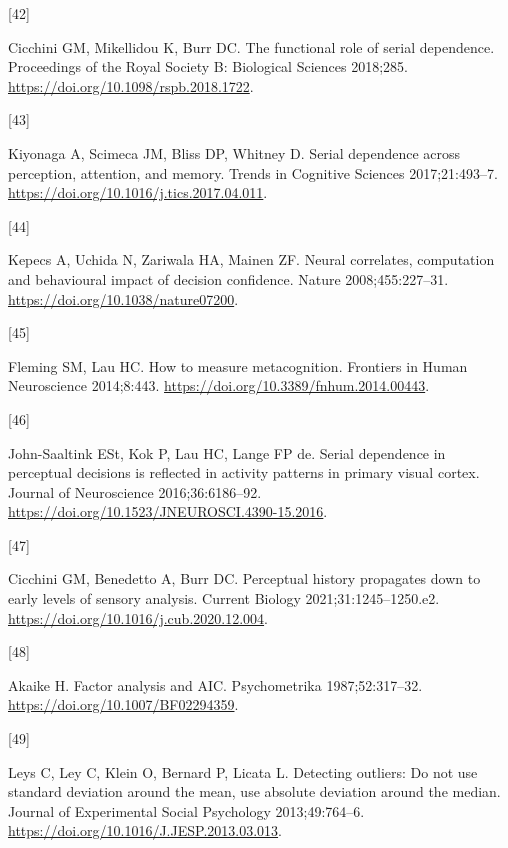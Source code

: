 \documentclass[
]{article}
\newlength{\cslhangindent}
\newlength{\csllabelwidth}
\newlength{\cslentryspacingunit} %
\newenvironment{CSLReferences}[2] %
 {%
  \setlength{\parindent}{0pt}
  \ifodd #1
  \let\oldpar\par
  \def\par{\hangindent=\cslhangindent\oldpar}
  \fi
  \setlength{\parskip}{#2\cslentryspacingunit}
 }%
 {}
\newcommand{\CSLLeftMargin}[1]{\parbox[t]{\csllabelwidth}{#1}}
\newcommand{\CSLRightInline}[1]{\parbox[t]{\linewidth - \csllabelwidth}{#1}\break}
\begin{document}
\begin{CSLReferences}{0}{0}
\leavevmode{}%
\CSLLeftMargin{{[}42{]} }%
\CSLRightInline{Cicchini GM, Mikellidou K, Burr DC. The functional role
of serial dependence. Proceedings of the Royal Society B: Biological
Sciences 2018;285. \url{https://doi.org/10.1098/rspb.2018.1722}.}

\leavevmode{}%
\CSLLeftMargin{{[}43{]} }%
\CSLRightInline{Kiyonaga A, Scimeca JM, Bliss DP, Whitney D. Serial
dependence across perception, attention, and memory. Trends in Cognitive
Sciences 2017;21:493--7.
\url{https://doi.org/10.1016/j.tics.2017.04.011}.}

\leavevmode{}%
\CSLLeftMargin{{[}44{]} }%
\CSLRightInline{Kepecs A, Uchida N, Zariwala HA, Mainen ZF. Neural
correlates, computation and behavioural impact of decision confidence.
Nature 2008;455:227--31. \url{https://doi.org/10.1038/nature07200}.}

\leavevmode{}%
\CSLLeftMargin{{[}45{]} }%
\CSLRightInline{Fleming SM, Lau HC. How to measure metacognition.
Frontiers in Human Neuroscience 2014;8:443.
\url{https://doi.org/10.3389/fnhum.2014.00443}.}

\leavevmode{}%
\CSLLeftMargin{{[}46{]} }%
\CSLRightInline{John-Saaltink ESt, Kok P, Lau HC, Lange FP de. Serial
dependence in perceptual decisions is reflected in activity patterns in
primary visual cortex. Journal of Neuroscience 2016;36:6186--92.
\url{https://doi.org/10.1523/JNEUROSCI.4390-15.2016}.}

\leavevmode{}%
\CSLLeftMargin{{[}47{]} }%
\CSLRightInline{Cicchini GM, Benedetto A, Burr DC. Perceptual history
propagates down to early levels of sensory analysis. Current Biology
2021;31:1245--1250.e2. \url{https://doi.org/10.1016/j.cub.2020.12.004}.}

\leavevmode{}%
\CSLLeftMargin{{[}48{]} }%
\CSLRightInline{Akaike H. Factor analysis and AIC. Psychometrika
1987;52:317--32. \url{https://doi.org/10.1007/BF02294359}.}

\leavevmode{}%
\CSLLeftMargin{{[}49{]} }%
\CSLRightInline{Leys C, Ley C, Klein O, Bernard P, Licata L. Detecting
outliers: Do not use standard deviation around the mean, use absolute
deviation around the median. Journal of Experimental Social Psychology
2013;49:764--6. \url{https://doi.org/10.1016/J.JESP.2013.03.013}.}


\end{CSLReferences}
\end{document}
